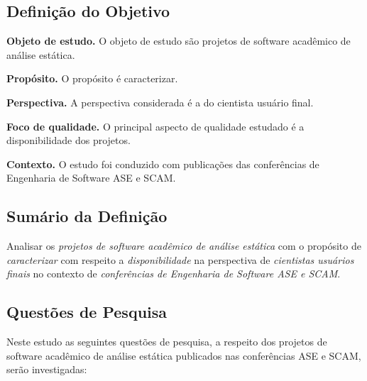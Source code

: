 \subsection{Definição do Objetivo}

\begin{description}
  \item{\bf Objeto de estudo.}
     O objeto de estudo são projetos de software acadêmico de análise estática.
  \item{\bf Propósito.}
    O propósito é caracterizar.
  \item{\bf Perspectiva.}
    A perspectiva considerada é a do cientista usuário final.
  \item{\bf Foco de qualidade.}
    O principal aspecto de qualidade estudado é a disponibilidade dos projetos.
  \item{\bf Contexto.}
    O estudo foi conduzido com publicações das conferências de Engenharia de Software ASE e SCAM.
\end{description}

\subsection{Sumário da Definição}

Analisar os \textit{projetos de software acadêmico de análise estática}
com o propósito de \textit{caracterizar}
com respeito a \textit{disponibilidade}
na perspectiva de \textit{cientistas usuários finais}
no contexto de \textit{conferências de Engenharia de Software ASE e SCAM}.

\subsection{Questões de Pesquisa}

Neste estudo as seguintes questões de pesquisa, a respeito dos projetos de
software acadêmico de análise estática publicados nas conferências ASE e SCAM,
serão investigadas:

\newcommand{\EstudoUmQuestaoUm}{
  Os projetos de software acadêmico de análise estática publicados nas conferências ASE e SCAM possuem alguma presença oficial online?
}
\newcommand{\EstudoUmQuestaoDois}{
  Os projetos de software academico de análise estática publicados nas conferências ASE e SCAM estão disponíveis para download?
}
\newcommand{\EstudoUmQuestaoTres}{
  É possível ter acesso ao código fonte dos projetos de software de análise estática publicados nas conferências ASE e SCAM?
}
\newcommand{\EstudoUmQuestaoQuatro}{
  Os projetos de software com código fonte disponível podem ser adaptados para atender necessidades emergentes?
}

